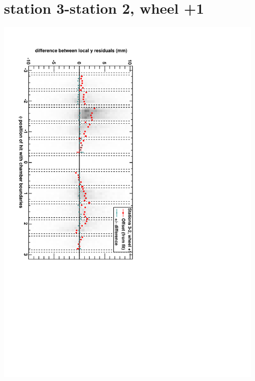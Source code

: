 \documentclass[compress]{beamer}
\begin{document}
\section*{station 3-station 2, wheel +1}
\begin{frame} \vfill \mbox{\hspace{-1 cm}\includegraphics[height=1.2\linewidth, angle=90]{DTzdiff23VsPhi_whD_slope.pdf}} \end{frame}
\end{document}
